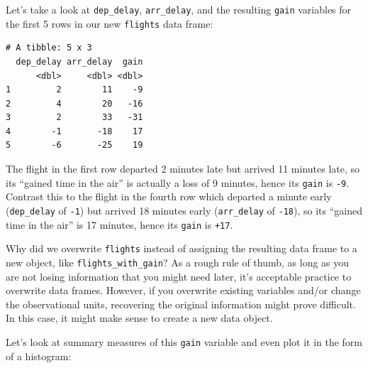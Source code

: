 \documentclass[12pt,]{krantz}
\makeatletter
\newenvironment{Shaded}{\begin{snugshade}}{\end{snugshade}}
\newcommand{\KeywordTok}[1]{\textcolor[rgb]{0.27,0.27,0.27}{\textbf{#1}}}
\newcommand{\DataTypeTok}[1]{\textcolor[rgb]{0.27,0.27,0.27}{#1}}
\newcommand{\StringTok}[1]{\textcolor[rgb]{0.5,0.5,0.5}{#1}}
\newcommand{\OperatorTok}[1]{\textcolor[rgb]{0.43,0.43,0.43}{\textbf{#1}}}
\newcommand{\NormalTok}[1]{#1}
\newenvironment{kframe}{%
\medskip{}
\setlength{\fboxsep}{.8em}
 \def\at@end@of@kframe{}%
 \ifinner\ifhmode%
  \def\at@end@of@kframe{\end{minipage}}%
  \begin{minipage}{\columnwidth}%
 \fi\fi%
 \def\FrameCommand##1{\hskip\@totalleftmargin \hskip-\fboxsep
 \colorbox{shadecolor}{##1}\hskip-\fboxsep
     \hskip-\linewidth \hskip-\@totalleftmargin \hskip\columnwidth}%
 \MakeFramed {\advance\hsize-\width
   \@totalleftmargin\z@ \linewidth\hsize
   \@setminipage}}%
 {\par\unskip\endMakeFramed%
 \at@end@of@kframe}
\renewenvironment{Shaded}{\begin{kframe}}{\end{kframe}}
\theoremstyle{definition}
\theoremstyle{definition}
\theoremstyle{definition}
\theoremstyle{remark}
\makeatother
\begin{document}
\begin{Shaded}
\end{Shaded}

Let's take a look at \texttt{dep\_delay}, \texttt{arr\_delay}, and the
resulting \texttt{gain} variables for the first 5 rows in our new
\texttt{flights} data frame:

\begin{verbatim}
# A tibble: 5 x 3
  dep_delay arr_delay  gain
      <dbl>     <dbl> <dbl>
1         2        11    -9
2         4        20   -16
3         2        33   -31
4        -1       -18    17
5        -6       -25    19
\end{verbatim}

The flight in the first row departed 2 minutes late but arrived 11
minutes late, so its ``gained time in the air'' is actually a loss of 9
minutes, hence its \texttt{gain} is \texttt{-9}. Contrast this to the
flight in the fourth row which departed a minute early
(\texttt{dep\_delay} of \texttt{-1}) but arrived 18 minutes early
(\texttt{arr\_delay} of \texttt{-18}), so its ``gained time in the air''
is 17 minutes, hence its \texttt{gain} is \texttt{+17}.

Why did we overwrite \texttt{flights} instead of assigning the resulting
data frame to a new object, like \texttt{flights\_with\_gain}? As a
rough rule of thumb, as long as you are not losing information that you
might need later, it's acceptable practice to overwrite data frames.
However, if you overwrite existing variables and/or change the
observational units, recovering the original information might prove
difficult. In this case, it might make sense to create a new data
object.

Let's look at summary measures of this \texttt{gain} variable and even
plot it in the form of a histogram:
\end{document}
